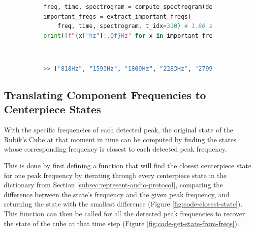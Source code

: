 \begin{figure}[h]
\caption{Example peak frequency decoding at a specific time step}
\label{fig:code-extract-important-freqs-demo}
\begin{subfigure}{\textwidth}
\begin{lstlisting}[language=Python]
freq, time, spectrogram = compute_spectrogram(demo_wav_path)
important_freqs = extract_important_freqs(
    freq, time, spectrogram, t_idx=310) # 1.80 seconds
print([f"{x["hz"]:.0f}Hz" for x in important_freqs])
\end{lstlisting}
\end{subfigure}\\

\begin{subfigure}{\textwidth}
\begin{lstlisting}[language=Python, numbers=none]
>> ["818Hz", "1593Hz", "1809Hz", "2283Hz", "2799Hz", "3316Hz"]
\end{lstlisting}
\end{subfigure}
\end{figure}

\subsection{Translating Component Frequencies to Centerpiece States}
\label{subsec:translating-freqs-to-state}

With the specific frequencies of each detected peak, the original state
of the Rubik's Cube at that moment in time can be computed by finding
the states whose corresponding frequency is closest to each detected
peak frequency.

This is done by first defining a function that will find the closest
centerpiece state for one peak frequency by iterating through every
centerpiece state in the  dictionary from
Section \ref{subsec:represent-audio-protocol}, comparing the difference
between the state's frequency and the given peak frequency, and
returning the state with the smallest difference (Figure
\ref{fig:code-closest-state}). This function can then be called for all
the detected peak frequencies to recover the state of the cube at that
time step (Figure \ref{fig:code-get-state-from-freqs}).

